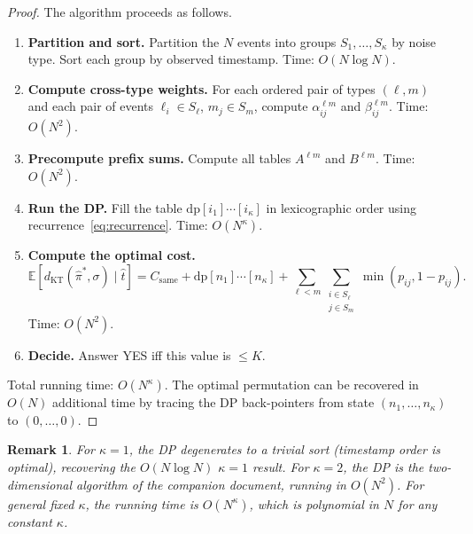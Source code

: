 \documentclass[11pt]{article}
\newtheorem*{remark}{Remark}
\begin{document}
\begin{proof}
The algorithm proceeds as follows.

\begin{enumerate}
\item \textbf{Partition and sort.}  Partition the $N$ events into groups $S_1, \ldots,
  S_\kappa$ by noise type.  Sort each group by observed timestamp.  Time: $O(N \log N)$.

\item \textbf{Compute cross-type weights.}  For each ordered pair of types $(\ell,m)$
  and each pair of events $\ell_i \in S_\ell$, $m_j \in S_m$, compute $\alpha_{ij}^{\ell
  m}$ and $\beta_{ij}^{\ell m}$.  Time: $O(N^2)$.

\item \textbf{Precompute prefix sums.}  Compute all tables $A^{\ell m}$ and $B^{\ell
  m}$.  Time: $O(N^2)$.

\item \textbf{Run the DP.}  Fill the table $\mathrm{dp}[i_1]\cdots[i_\kappa]$ in
  lexicographic order using recurrence~\eqref{eq:recurrence}.  Time: $O(N^\kappa)$.

\item \textbf{Compute the optimal cost.}
  \begin{equation}
    \mathbb{E}[d_{\mathrm{KT}}(\hat{\pi}^*,\sigma)\mid\hat{t}]
    = C_{\mathrm{same}}
    + \mathrm{dp}[n_1]\cdots[n_\kappa]
    + \sum_{\ell < m}\sum_{\substack{i \in S_\ell \\ j \in S_m}} \min(p_{ij}, 1 - p_{ij}).
  \end{equation}
  Time: $O(N^2)$.

\item \textbf{Decide.}  Answer YES iff this value is $\le K$.
\end{enumerate}

Total running time: $O(N^\kappa)$.  The optimal permutation can be recovered in
$O(N)$ additional time by tracing the DP back-pointers from state
$(n_1, \ldots, n_\kappa)$ to $(0, \ldots, 0)$.
\end{proof}

\begin{remark}
For $\kappa = 1$, the DP degenerates to a trivial sort (timestamp order is optimal),
recovering the $O(N \log N)$ $\kappa = 1$ result.  For $\kappa = 2$, the DP is the
two-dimensional algorithm of the companion document, running in $O(N^2)$.  For general
fixed $\kappa$, the running time is $O(N^\kappa)$, which is polynomial in $N$ for any
constant $\kappa$.
\end{remark}
\end{document}
